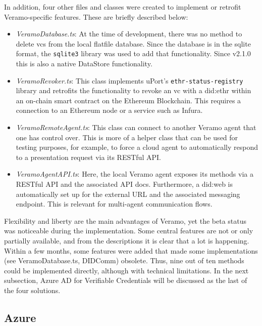         In addition, four other files and classes were created to implement or retrofit Veramo-specific features. These are briefly described below:
    
        \begin{itemize}
            \item \textit{VeramoDatabase.ts}: At the time of development, there was no method to delete \acp{vc} from the local flatfile database. Since the database is in the sqlite format, the \texttt{sqlite3} library was used to add that functionality. Since v2.1.0 this is also a native DataStore functionality.
            \item \textit{VeramoRevoker.ts}: This class implements uPort's \texttt{ethr-status-registry} library and retrofits the functionality to revoke an \ac{vc} with a did:ethr within an on-chain smart contract on the Ethereum Blockchain. This requires a connection to an Ethereum node or a service such as Infura.
            \item \textit{VeramoRemoteAgent.ts}: This class can connect to another Veramo agent that one has control over. This is more of a helper class that can be used for testing purposes, for example, to force a cloud agent to automatically respond to a presentation request via its RESTful API.
            \item \textit{VeramoAgentAPI.ts}: Here, the local Veramo agent exposes its methods via a RESTful API and the associated API docs. Furthermore, a did:web is automatically set up for the external URL and the associated messaging endpoint. This is relevant for multi-agent communication flows.
        \end{itemize}
    
        Flexibility and liberty are the main advantages of Veramo, yet the beta status was noticeable during the implementation. Some central features are not or only partially available, and from the descriptions it is clear that a lot is happening. Within a few months, some features were added that made some implementations (see VeramoDatabase.ts, DIDComm) obsolete. Thus, nine out of ten methods could be implemented directly, although with technical limitations. In the next subsection, Azure AD for Verifiable Credentials will be discussed as the last of the four solutions. 
    
        \subsection{Azure}
        

